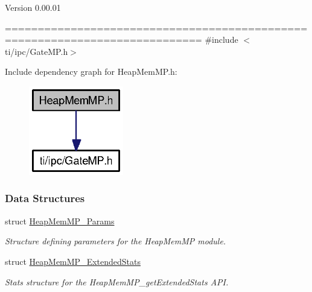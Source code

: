 \begin{DoxyVersion}{Version}
0.00.01
\end{DoxyVersion}
============================================================================ {\ttfamily \#include $<$ti/ipc/GateMP.h$>$}\par
Include dependency graph for HeapMemMP.h:
\nopagebreak
\begin{figure}[H]
\begin{center}
\leavevmode
\includegraphics[width=117pt]{_heap_mem_m_p_8h__incl}
\end{center}
\end{figure}
\subsubsection*{Data Structures}
\begin{DoxyCompactItemize}
\item 
struct \hyperlink{struct_heap_mem_m_p___params}{HeapMemMP\_\-Params}
\begin{DoxyCompactList}\small\item\em Structure defining parameters for the HeapMemMP module. \item\end{DoxyCompactList}\item 
struct \hyperlink{struct_heap_mem_m_p___extended_stats}{HeapMemMP\_\-ExtendedStats}
\begin{DoxyCompactList}\small\item\em Stats structure for the HeapMemMP\_\-getExtendedStats API. \item\end{DoxyCompactList}\end{DoxyCompactItemize}
